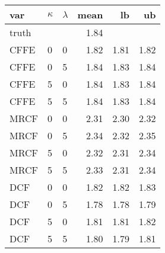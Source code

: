 \begin{tabular}{lllrrr}
  \hline
var & $\kappa$ & $\lambda$ & mean & lb & ub \\ 
  \hline
truth &  &  & 1.84 &  &  \\ 
  CFFE  & 0 & 0 & 1.82 & 1.81 & 1.82 \\ 
  CFFE  & 0 & 5 & 1.84 & 1.83 & 1.84 \\ 
  CFFE  & 5 & 0 & 1.84 & 1.83 & 1.84 \\ 
  CFFE  & 5 & 5 & 1.84 & 1.83 & 1.84 \\ 
  MRCF  & 0 & 0 & 2.31 & 2.30 & 2.32 \\ 
  MRCF  & 0 & 5 & 2.34 & 2.32 & 2.35 \\ 
  MRCF  & 5 & 0 & 2.32 & 2.31 & 2.34 \\ 
  MRCF  & 5 & 5 & 2.33 & 2.31 & 2.34 \\ 
  DCF  & 0 & 0 & 1.82 & 1.82 & 1.83 \\ 
  DCF  & 0 & 5 & 1.78 & 1.78 & 1.79 \\ 
  DCF  & 5 & 0 & 1.81 & 1.81 & 1.82 \\ 
  DCF  & 5 & 5 & 1.80 & 1.79 & 1.81 \\ 
   \hline
\end{tabular}
